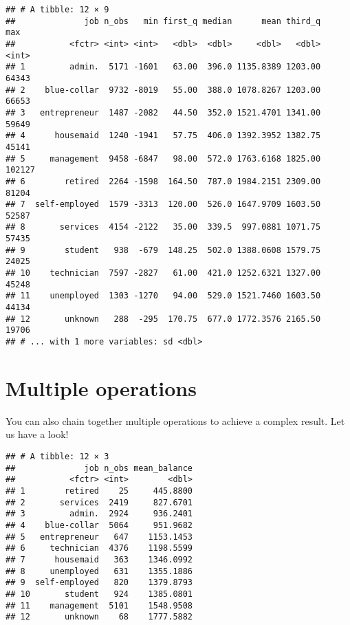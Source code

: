 \documentclass[]{book}
\newenvironment{Shaded}{\begin{snugshade}}{\end{snugshade}}
\newcommand{\KeywordTok}[1]{\textcolor[rgb]{0.13,0.29,0.53}{\textbf{{#1}}}}
\newcommand{\DataTypeTok}[1]{\textcolor[rgb]{0.13,0.29,0.53}{{#1}}}
\newcommand{\DecValTok}[1]{\textcolor[rgb]{0.00,0.00,0.81}{{#1}}}
\newcommand{\StringTok}[1]{\textcolor[rgb]{0.31,0.60,0.02}{{#1}}}
\newcommand{\CommentTok}[1]{\textcolor[rgb]{0.56,0.35,0.01}{\textit{{#1}}}}
\newcommand{\OtherTok}[1]{\textcolor[rgb]{0.56,0.35,0.01}{{#1}}}
\newcommand{\NormalTok}[1]{{#1}}
\begin{document}
\begin{verbatim}
## # A tibble: 12 × 9
##              job n_obs   min first_q median      mean third_q    max
##           <fctr> <int> <int>   <dbl>  <dbl>     <dbl>   <dbl>  <int>
## 1         admin.  5171 -1601   63.00  396.0 1135.8389 1203.00  64343
## 2    blue-collar  9732 -8019   55.00  388.0 1078.8267 1203.00  66653
## 3   entrepreneur  1487 -2082   44.50  352.0 1521.4701 1341.00  59649
## 4      housemaid  1240 -1941   57.75  406.0 1392.3952 1382.75  45141
## 5     management  9458 -6847   98.00  572.0 1763.6168 1825.00 102127
## 6        retired  2264 -1598  164.50  787.0 1984.2151 2309.00  81204
## 7  self-employed  1579 -3313  120.00  526.0 1647.9709 1603.50  52587
## 8       services  4154 -2122   35.00  339.5  997.0881 1071.75  57435
## 9        student   938  -679  148.25  502.0 1388.0608 1579.75  24025
## 10    technician  7597 -2827   61.00  421.0 1252.6321 1327.00  45248
## 11    unemployed  1303 -1270   94.00  529.0 1521.7460 1603.50  44134
## 12       unknown   288  -295  170.75  677.0 1772.3576 2165.50  19706
## # ... with 1 more variables: sd <dbl>
\end{verbatim}

\section{Multiple operations}\label{multiple-operations}

You can also chain together multiple operations to achieve a complex
result. Let us have a look!

\begin{Shaded}
\end{Shaded}

\begin{verbatim}
## # A tibble: 12 × 3
##              job n_obs mean_balance
##           <fctr> <int>        <dbl>
## 1        retired    25     445.8800
## 2       services  2419     827.6701
## 3         admin.  2924     936.2401
## 4    blue-collar  5064     951.9682
## 5   entrepreneur   647    1153.1453
## 6     technician  4376    1198.5599
## 7      housemaid   363    1346.0992
## 8     unemployed   631    1355.1886
## 9  self-employed   820    1379.8793
## 10       student   924    1385.0801
## 11    management  5101    1548.9508
## 12       unknown    68    1777.5882
\end{verbatim}
\end{document}
